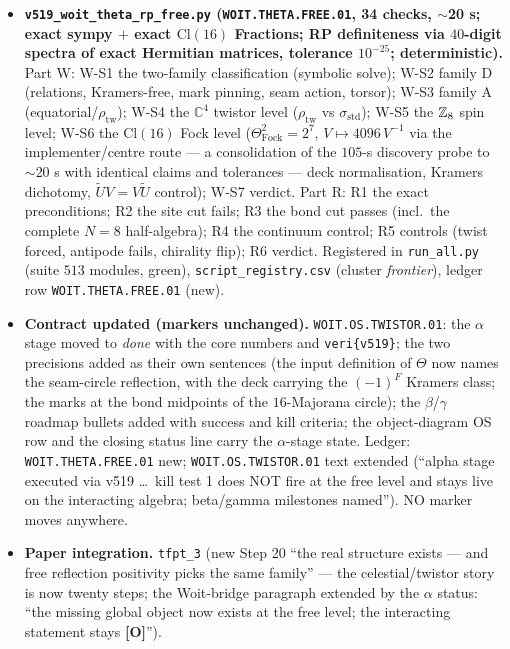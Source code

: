 \documentclass[11pt]{article}
\providecommand{\mO}{\textbf{[O]}}\providecommand{\mX}{\textbf{[X]}}
\begin{document}
\begin{itemize}[leftmargin=1.5em]
\item \textbf{\texttt{v519\_woit\_theta\_rp\_free.py} (\texttt{WOIT.THETA.FREE.01}, 34 checks,
$\sim$20 s; exact sympy $+$ exact $\mathrm{Cl}(16)$ Fractions; RP definiteness via $40$-digit
spectra of exact Hermitian matrices, tolerance $10^{-25}$; deterministic).} Part W: W-S1 the
two-family classification (symbolic solve); W-S2 family D (relations, Kramers-free, mark
pinning, seam action, torsor); W-S3 family A (equatorial/$\rho_{\mathrm{tw}}$); W-S4 the $\mathbb{C}^4$
twistor level ($\rho_{\mathrm{tw}}$ vs $\sigma_{\mathrm{std}}$); W-S5 the $\mathbb{Z}_8$ spin level;
W-S6 the $\mathrm{Cl}(16)$ Fock level ($\Theta_{\mathrm{Fock}}^2=2^7$, $V\mapsto4096\,V^{-1}$
via the implementer/centre route --- a consolidation of the $105$-s discovery probe to
$\sim$20 s with identical claims and tolerances --- deck normalisation, Kramers dichotomy,
$\tilde U V=V\tilde U$ control); W-S7 verdict. Part R: R1 the exact preconditions; R2 the site
cut fails; R3 the bond cut passes (incl.\ the complete $N=8$ half-algebra); R4 the continuum
control; R5 controls (twist forced, antipode fails, chirality flip); R6 verdict. Registered in
\texttt{run\_all.py} (suite $513$ modules, green), \texttt{script\_registry.csv} (cluster
\emph{frontier}), ledger row \texttt{WOIT.THETA.FREE.01} (new).
\item \textbf{Contract updated (markers unchanged).} \texttt{WOIT.OS.TWISTOR.01}: the $\alpha$
stage moved to \emph{done} with the core numbers and \texttt{veri\{v519\}}; the two precisions
added as their own sentences (the input definition of $\Theta$ now names the seam-circle
reflection, with the deck carrying the $(-1)^F$ Kramers class; the marks at the bond midpoints
of the $16$-Majorana circle); the $\beta$/$\gamma$ roadmap bullets added with success and kill
criteria; the object-diagram OS row and the closing status line carry the $\alpha$-stage state.
Ledger: \texttt{WOIT.THETA.FREE.01} new; \texttt{WOIT.OS.TWISTOR.01} text extended (``alpha
stage executed via v519 \dots\ kill test 1 does NOT fire at the free level and stays live on
the interacting algebra; beta/gamma milestones named''). NO marker moves anywhere.
\item \textbf{Paper integration.} \texttt{tfpt\_3} (new Step 20 ``the real structure exists ---
and free reflection positivity picks the same family'' --- the celestial/twistor story is now
twenty steps; the Woit-bridge paragraph extended by the $\alpha$ status: ``the missing global
object now exists at the free level; the interacting statement stays \mO'').

\end{itemize}
\end{document}
